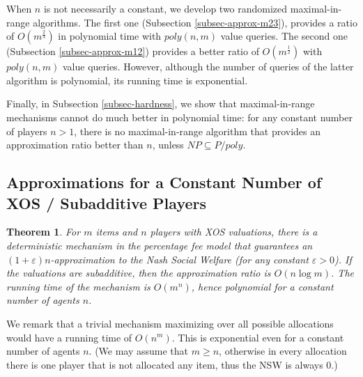 \documentclass{article}
\newtheorem{theorem}{Theorem}\newtheorem{lemma}[theorem]{Lemma}\newtheorem{proposition}[theorem]{Proposition}\newtheorem{corollary}[theorem]{Corollary}\newtheorem{definition}[theorem]{Definition}\newtheorem{claim}[theorem]{Claim}\newtheorem*{claim*}{Claim}\newenvironment{subproof}{\begin{proof}[Proof of claim]}{\end{proof}}
\newcommand{\eps}{\varepsilon}
\begin{document}
When $n$ is not necessarily a constant, we develop two randomized maximal-in-range algorithms. The first one (Subsection \ref{subsec-approx-m23}), provides a ratio of $O(m^{\frac 2 3})$ in polynomial time with $poly(n,m)$ value queries. The second one (Subsection \ref{subsec-approx-m12}) provides a better ratio of $O(m^{\frac12})$ with $poly(n,m)$ value queries. However, although the number of queries of the latter algorithm is polynomial, its running time is exponential.

Finally, in Subsection \ref{subsec-hardness}, we show that maximal-in-range mechanisms cannot do much better in polynomial time: for any constant number of players $n>1$, there is no maximal-in-range algorithm that provides an approximation ratio better than $n$, unless $NP\subseteq P/poly$.  


\subsection{Approximations for a Constant Number of XOS / Subadditive Players}\label{subsec-approx-constant-number}

\begin{theorem}
For $m$ items and $n$ players with XOS valuations, there is a deterministic mechanism in the percentage fee model that guarantees an $(1+\eps)n$-approximation to the Nash Social Welfare (for any constant $\eps>0$). If the valuations are subadditive, then the approximation ratio is $O(n \log m)$. The running time of the mechanism is $O(m^n)$, hence polynomial for a constant number of agents $n$.
\end{theorem} 

We remark that a trivial mechanism maximizing over all possible allocations would have a running time of $O(n^m)$. This is exponential even for a constant number of agents $n$. (We may assume that $m \geq n$, otherwise in every allocation there is one player that is not allocated any item, thus the NSW is always $0$.)
\end{document}
